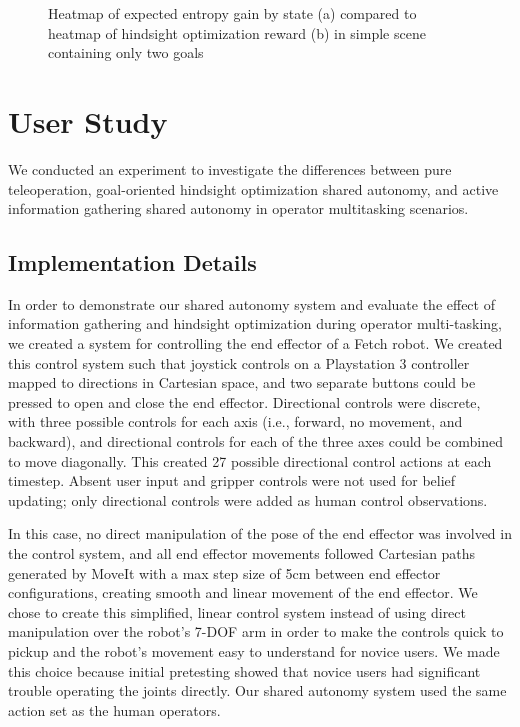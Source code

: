 \documentclass[conference]{IEEEtran}
\begin{document}
\begin{figure}
\caption{Heatmap of expected entropy gain by state (a) compared to heatmap of hindsight optimization reward (b) in simple scene containing only two goals}
\label{heatmap3}
\end{figure}

\section{User Study}

We conducted an experiment to investigate the differences between pure teleoperation, goal-oriented hindsight optimization shared autonomy, and active information gathering shared autonomy in operator multitasking scenarios.

\subsection{Implementation Details}\label{implementation}
In order to demonstrate our shared autonomy system and evaluate the effect of information gathering and hindsight optimization during operator multi-tasking, we created a system for controlling the end effector of a Fetch robot. We created this control system such that joystick controls on a Playstation 3 controller mapped to directions in Cartesian space, and two separate buttons could be pressed to open and close the end effector. Directional controls were discrete, with three possible controls for each axis (i.e., forward, no movement, and backward), and directional controls for each of the three axes could be combined to move diagonally. This created 27 possible directional control actions at each timestep. Absent user input and gripper controls were not used for belief updating; only directional controls were added as human control observations.


In this case, no direct manipulation of the pose of the end effector was involved in the control system, and all end effector movements followed Cartesian paths generated by MoveIt \cite{sucan2013moveit} with a max step size of 5cm between end effector configurations, creating smooth and linear movement of the end effector. We chose to create this simplified, linear control system instead of using direct manipulation over the robot's 7-DOF arm in order to make the controls quick to pickup and the robot's movement easy to understand for novice users. We made this choice because initial pretesting showed that novice users had significant trouble operating the joints directly. Our shared autonomy system used the same action set as the human operators.
\end{document}
